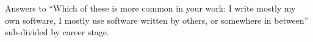 Answers to ``Which of these is more common in your work: I write mostly my own software, I mostly use software written by others, or somewhere in between'' sub-divided by career stage.